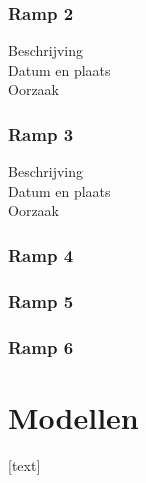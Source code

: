 \documentclass{article}
\begin{document}
			\subsubsection{Ramp 2}
			\begin{description}
			\item[Beschrijving]
			\item[Datum en plaats] 
			\item[Oorzaak]
			\end{description}
			
			\subsubsection{Ramp 3}
			\begin{description}
			\item[Beschrijving]
			\item[Datum en plaats] 
			\item[Oorzaak]
			\end{description}
			
			\subsubsection{Ramp 4}
			\subsubsection{Ramp 5}
			\subsubsection{Ramp 6}
		
	\newpage
	
	
	\section{Modellen}
	
	[text]
	
\end{document}

